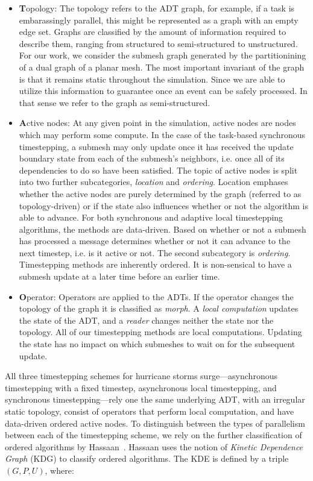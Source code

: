 \begin{itemize}
\item {\bf T}opology: The topology refers to the ADT graph, for example, if a task is embarassingly parallel, this might be represented as a graph with an empty edge set. Graphs are classified by the amount of information required to describe them, ranging from structured to semi-structured to unstructured. For our work, we consider the submesh graph generated by the partitionining of a dual graph of a planar mesh. The most important invariant of the graph is that it remains static throughout the simulation. Since we are able to utilize this information to guarantee once an event can be safely processed. In that sense we refer to the graph as semi-structured.
\item {\bf A}ctive nodes: At any given point in the simulation, active nodes are nodes which may perform some compute. In the case of the task-based synchronous timestepping, a submesh may only update once it has received the update boundary state from each of the submesh's neighbors, i.e. once all of its dependencies to do so have been satisfied. The topic of active nodes is split into two further subcategories, {\em location} and {\em ordering}. Location emphases whether the active nodes are purely determined by the graph (referred to as topology-driven) or if the state also influences whether or not the algorithm is able to advance. For both synchronous and adaptive local timestepping algorithms, the methods are data-driven. Based on whether or not a submesh has processed a message determines whether or not it can advance to the next timestep, i.e. is it active or not. The second subcategory is {\em ordering}. Timestepping methods are inherently ordered. It is non-sensical to have a submesh update at a later time before an earlier time.
\item {\bf O}perator: Operators are applied to the ADTs. If the operator changes the topology of the graph it is classified as {\em morph}. A {\em local computation} updates the state of the ADT, and a {\em reader} changes neither the state nor the topology. All of our timestepping methods are local computations. Updating the state has no impact on which submeshes to wait on for the subsequent update.
\end{itemize}
All three timestepping schemes for hurricane storms surge---asynchronous timestepping with a fixed timestep, asynchronous local timestepping, and synchronous timestepping---rely one the same underlying ADT, with an irregular static topology, consist of operators that perform local computation, and have data-driven ordered active nodes. To distinguish between the types of parallelism between each of the timestepping scheme, we rely on the further classification of ordered algorithms by Hassaan~\cite{Hassaan1, Hassaan2}. Hassaan uses the notion of {\em Kinetic Dependence Graph} (KDG) to classify ordered algorithms. The KDE is defined by a triple $(G,P,U)$, where:
